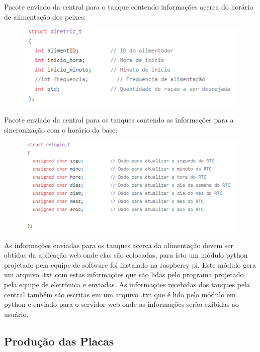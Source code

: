\pagebreak

Pacote enviado da central para o tanque contendo informações acerca do horário de alimentação dos peixes:

\begin{figure}[h]
\centering \includegraphics[keepaspectratio=true,scale=0.5]{figuras/diretriz_t}
\label{diretriz_t}
\end{figure}

\pagebreak

Pacote enviado da central para os tanques contendo as informações para a sincronização com o horário da base:

\begin{figure}[h]
\centering \includegraphics[keepaspectratio=true,scale=0.7]{figuras/relogio_t}
\label{relogio_t}
\end{figure}

\pagebreak

As informações enviadas para os tanques acerca da alimentação devem ser obtidas da aplicação web onde elas são colocadas, para isto um módulo python projetado pela equipe de software foi instalado na raspberry pi. Este módulo gera um arquivo .txt com estas informações que são lidas pelo programa projetado pela equipe de eletrônica e enviadas. As informações recebidas dos tanques pela central também são escritas em um arquivo .txt que é lido pelo módulo em python e enviado para o servidor web onde as informações serão exibidas ao usuário.


\subsection{Produção das Placas}

